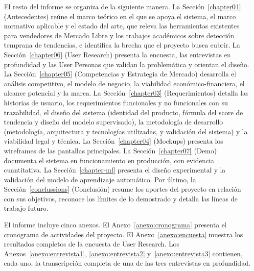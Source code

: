 El resto del informe se organiza de la siguiente manera. La Sección~\ref{chapter01} (Antecedentes) reúne el marco teórico en el que se apoya el sistema, el marco normativo aplicable y el estado del arte, que releva las herramientas existentes para vendedores de Mercado Libre y los trabajos académicos sobre detección temprana de tendencias, e identifica la brecha que el proyecto busca cubrir. La Sección~\ref{chapter06} (User Research) presenta la encuesta, las entrevistas en profundidad y las User Personas que validan la problemática y orientan el diseño. La Sección~\ref{chapter05} (Competencias y Estrategia de Mercado) desarrolla el análisis competitivo, el modelo de negocio, la viabilidad económico-financiera, el alcance potencial y la marca. La Sección~\ref{chapter03} (Requerimientos) detalla las historias de usuario, los requerimientos funcionales y no funcionales con su trazabilidad, el diseño del sistema (identidad del producto, fórmula del score de tendencia y diseño del modelo supervisado), la metodología de desarrollo (metodología, arquitectura y tecnologías utilizadas, y validación del sistema) y la viabilidad legal y técnica. La Sección~\ref{chapter04} (Mockups) presenta los wireframes de las pantallas principales. La Sección~\ref{chapter07} (Demo) documenta el sistema en funcionamiento en producción, con evidencia cuantitativa. La Sección~\ref{chapter-ml} presenta el diseño experimental y la validación del modelo de aprendizaje automático. Por último, la Sección~\ref{conclussions} (Conclusión) resume los aportes del proyecto en relación con sus objetivos, reconoce los límites de lo demostrado y detalla las líneas de trabajo futuro.

El informe incluye cinco anexos. El Anexo~\ref{anexo:cronograma} presenta el cronograma de actividades del proyecto. El Anexo~\ref{anexo:encuesta} muestra los resultados completos de la encuesta de User Research. Los Anexos~\ref{anexo:entrevista1}, \ref{anexo:entrevista2} y~\ref{anexo:entrevista3} contienen, cada uno, la transcripción completa de una de las tres entrevistas en profundidad.
